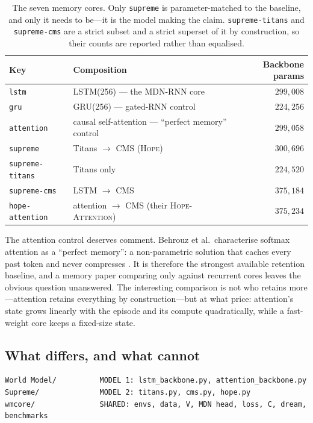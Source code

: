\documentclass[11pt,a4paper]{article}
\newcommand{\code}[1]{\texttt{\small #1}}
\begin{document}
\begin{table}[h]
\centering
\begin{tabular}{llr}
\toprule
Key & Composition & Backbone params \\
\midrule
\code{lstm}           & LSTM(256) --- the MDN-RNN core \cite{ha2018world} & $299{,}008$ \\
\code{gru}            & GRU(256) --- gated-RNN control & $224{,}256$ \\
\code{attention}      & causal self-attention --- ``perfect memory'' control & $299{,}058$ \\
\midrule
\code{supreme}        & Titans $\rightarrow$ CMS (\textsc{Hope}) & $300{,}696$ \\
\code{supreme-titans} & Titans only & $224{,}520$ \\
\code{supreme-cms}    & LSTM $\rightarrow$ CMS & $375{,}184$ \\
\code{hope-attention} & attention $\rightarrow$ CMS (their \textsc{Hope-Attention}) & $375{,}234$ \\
\bottomrule
\end{tabular}
\caption{The seven memory cores. Only \code{supreme} is parameter-matched to the
baseline, and only it needs to be---it is the model making the claim.
\code{supreme-titans} and \code{supreme-cms} are a strict subset and a strict
superset of it by construction, so their counts are reported rather than
equalised.}
\label{tab:backbones}
\end{table}

The attention control deserves comment. Behrouz et al.\ characterise softmax
attention as a ``perfect memory'': a non-parametric solution that caches every
past token and never compresses \cite[\S8]{behrouz2025nested}. It is therefore
the strongest available retention baseline, and a memory paper comparing only
against recurrent cores leaves the obvious question unanswered. The interesting
comparison is not who retains more---attention retains everything by
construction---but at what price: attention's state grows linearly with the
episode and its compute quadratically, while a fast-weight core keeps a
fixed-size state.

\subsection{What differs, and what cannot}
\label{sec:layout}

\begin{lstlisting}
World Model/          MODEL 1: lstm_backbone.py, attention_backbone.py
Supreme/              MODEL 2: titans.py, cms.py, hope.py
wmcore/               SHARED: envs, data, V, MDN head, loss, C, dream, benchmarks
\end{lstlisting}
\end{document}
